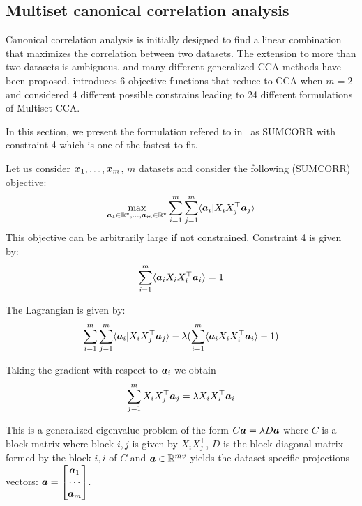 \subsection{Multiset canonical correlation analysis}
\label{sec:mcca}
Canonical correlation analysis is initially designed to find a linear
combination that maximizes the correlation between two datasets.
The extension to more than two datasets is ambiguous, and many
different generalized CCA methods have been proposed. \cite{kettenring1971canonical} introduces 6 objective functions that reduce to CCA when $m=2$ and \cite{nielsen2002multiset} considered 4 different possible constrains leading to 24 different formulations of Multiset CCA.

In this section, we present the formulation refered to
in~\cite{nielsen2002multiset} as SUMCORR with constraint 4 which is one of the
fastest to fit.

Let us consider $\boldsymbol{x}_1, \dots, \boldsymbol{x}_m$, $m$ datasets and consider the following (SUMCORR)
objective:
\begin{align}
  \max_{\boldsymbol{a}_1 \in \mathbb{R}^{v}, \dots, \boldsymbol{a}_m \in \mathbb{R}^{v}} \sum_{i=1}^m \sum_{j=1}^m \langle \boldsymbol{a}_i | X_i X_j^{\top} \boldsymbol{a}_j \rangle
\end{align}
This objective can be arbitrarily large if not constrained. Constraint 4 is
given by:
\begin{align}
  \sum_{i=1}^m \langle \boldsymbol{a}_i X_i X_i^{\top} \boldsymbol{a}_i \rangle = 1
\end{align}

The Lagrangian is given by:
\begin{align}
  \sum_{i=1}^m \sum_{j=1}^m \langle \boldsymbol{a}_i | X_i X_j^{\top} \boldsymbol{a}_j \rangle - \lambda (\sum_{i=1}^m \langle \boldsymbol{a}_i X_i X_i^{\top} \boldsymbol{a}_i \rangle - 1)
\end{align}

Taking the gradient with respect to $\boldsymbol{a}_i$ we obtain
\begin{align}
  \sum_{j=1}^m X_i X_j^{\top} \boldsymbol{a}_j = \lambda X_i X_i^{\top} \boldsymbol{a}_i
\end{align}

This is a generalized eigenvalue problem of the form $C \boldsymbol{a} = \lambda D \boldsymbol{a}$
where $C$ is a block matrix where block $i,j$ is given by $X_i X_j^{\top}$, 
$D$ is the block diagonal matrix formed by the block $i, i$ of $C$ and $\boldsymbol{a} \in
\mathbb{R}^{mv}$ yields the dataset specific projections vectors: $\boldsymbol{a} = \begin{bmatrix} \boldsymbol{a}_1 \\ \cdots \\
  \boldsymbol{a}_m \end{bmatrix}$.

